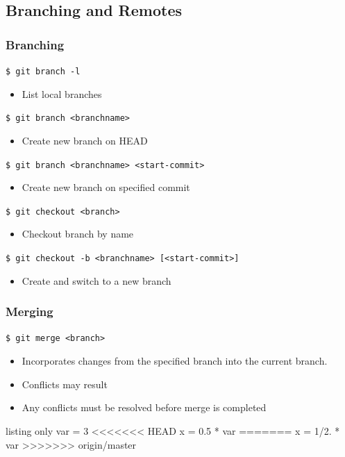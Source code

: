\documentclass[english,compress]{beamer}
\begin{document}
\subsection{Branching and Remotes}
\begin{frame}[fragile]
    \frametitle{Branching}

    \verb|$ git branch -l|
    \begin{itemize}
        \item List local branches
    \end{itemize}

    \verb|$ git branch <branchname> |
    \begin{itemize}
        \item Create new branch on HEAD
    \end{itemize}

    \verb|$ git branch <branchname> <start-commit>|
    \begin{itemize}
        \item Create new branch on specified commit
    \end{itemize}

    \verb|$ git checkout <branch>|
    \begin{itemize}
        \item Checkout branch by name
    \end{itemize}

    \verb|$ git checkout -b <branchname> [<start-commit>]|
    \begin{itemize}
        \item Create and switch to a new branch
    \end{itemize}
\end{frame}

\begin{frame}[fragile]
    \frametitle{Merging}

    \verb|$ git merge <branch>|
    \begin{itemize}
        \item Incorporates changes from the specified branch into the current
            branch.
        \item Conflicts may result
        \item Any conflicts must be resolved before merge is completed
    \end{itemize}

    \begin{tcblisting}{listing only}
var = 3
<<<<<<< HEAD
x = 0.5 * var
=======
x = 1/2. * var
>>>>>>> origin/master
    \end{tcblisting}
\end{frame}
\end{document}
